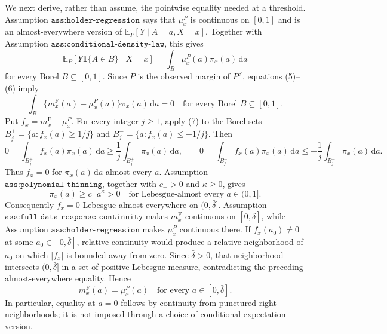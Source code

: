 We next derive, rather than assume, the pointwise equality needed at a threshold.  Assumption \(\texttt{ass:holder-regression}\) says that \(\mu_x^P\) is continuous on \([0,1]\) and is an almost-everywhere version of \(\mathbb E_P[Y\mid A=a,X=x]\).  Together with Assumption \(\texttt{ass:conditional-density-law}\), this gives
\[
 \mathbb E_P[Y\mathbf 1\{A\in B\}\mid X=x]
 =\int_B\mu_x^P(a)\pi_x(a)\,\mathrm da
 \tag{6}
\]
for every Borel \(B\subseteq[0,1]\).  Since \(P\) is the observed margin of \(P^{\mathrm F}\), equations (5)--(6) imply
\[
 \int_B\{m_x^{\mathrm F}(a)-\mu_x^P(a)\}\pi_x(a)\,\mathrm da=0
 \quad\text{for every Borel }B\subseteq[0,1].
 \tag{7}
\]
Put \(f_x=m_x^{\mathrm F}-\mu_x^P\).  For every integer \(j\geq1\), apply (7) to the Borel sets \(B_j^+=\{a:f_x(a)\geq1/j\}\) and \(B_j^-=\{a:f_x(a)\leq-1/j\}\).  Then
\[
 0=\int_{B_j^+}f_x(a)\pi_x(a)\,\mathrm da
 \geq \frac1j\int_{B_j^+}\pi_x(a)\,\mathrm da,
 \qquad
 0=\int_{B_j^-}f_x(a)\pi_x(a)\,\mathrm da
 \leq-\frac1j\int_{B_j^-}\pi_x(a)\,\mathrm da.
 \tag{8}
\]
Thus \(f_x=0\) for \(\pi_x(a)\,\mathrm da\)-almost every \(a\).  Assumption \(\texttt{ass:polynomial-thinning}\), together with \(c_->0\) and \(\kappa\geq0\), gives
\[
 \pi_x(a)\geq c_-a^\kappa>0
 \quad\text{for Lebesgue-almost every }a\in(0,1].
 \tag{9}
\]
Consequently \(f_x=0\) Lebesgue-almost everywhere on \((0,\bar\delta]\).  Assumption \(\texttt{ass:full-data-response-continuity}\) makes \(m_x^{\mathrm F}\) continuous on \([0,\bar\delta]\), while Assumption \(\texttt{ass:holder-regression}\) makes \(\mu_x^P\) continuous there.  If \(f_x(a_0)\neq0\) at some \(a_0\in[0,\bar\delta]\), relative continuity would produce a relative neighborhood of \(a_0\) on which \(|f_x|\) is bounded away from zero.  Since \(\bar\delta>0\), that neighborhood intersects \((0,\bar\delta]\) in a set of positive Lebesgue measure, contradicting the preceding almost-everywhere equality.  Hence
\[
 m_x^{\mathrm F}(a)=\mu_x^P(a)
 \quad\text{for every }a\in[0,\bar\delta].
 \tag{10}
\]
In particular, equality at \(a=0\) follows by continuity from punctured right neighborhoods; it is not imposed through a choice of conditional-expectation version.

